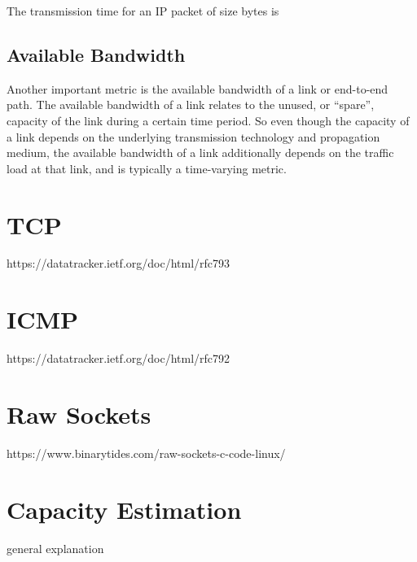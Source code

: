 
The transmission time for an IP packet of size bytes is

\subsection*{Available Bandwidth}
Another important metric is the available bandwidth of a link or end-to-end path. The available bandwidth of a link relates to the unused, or “spare”, capacity of the link during a certain time period. So even though the capacity of a link depends on the underlying transmission technology and propagation medium, the available bandwidth of a link additionally depends on the traffic load at that link, and is typically a time-varying metric.

\section{TCP}
https://datatracker.ietf.org/doc/html/rfc793

\section{ICMP}
https://datatracker.ietf.org/doc/html/rfc792

\section{Raw Sockets}
https://www.binarytides.com/raw-sockets-c-code-linux/

\section{Capacity Estimation}
general explanation